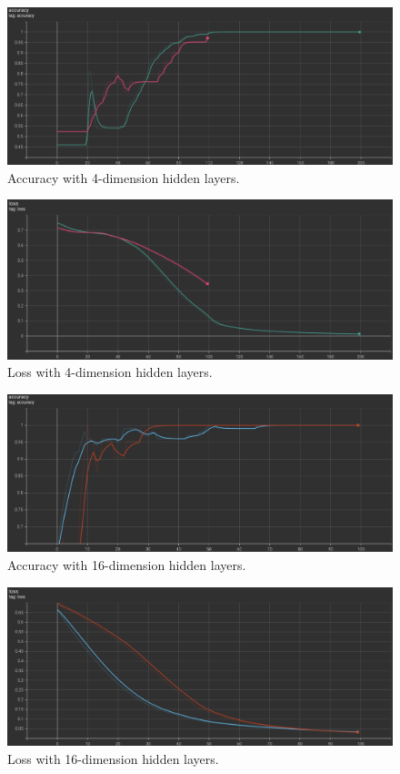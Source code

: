 	\begin{figure}[H]
		\centering
		\includegraphics[scale=0.5]{img/adam_acc.png}
		\caption{Accuracy with 4-dimension hidden layers.}
		\label{dim-acc-4}
	\end{figure}
	\begin{figure}[H]
		\centering
		\includegraphics[scale=0.5]{img/adam_loss.png}
		\caption{Loss with 4-dimension hidden layers.}
		\label{dim-loss-4}
	\end{figure}

	\begin{figure}[H]
		\centering
		\includegraphics[scale=0.5]{img/acc_16.png}
		\caption{Accuracy with 16-dimension hidden layers.}
		\label{dim-acc-16}
	\end{figure}
	\begin{figure}[H]
		\centering
		\includegraphics[scale=0.5]{img/loss_16.png}
		\caption{Loss with 16-dimension hidden layers.}
		\label{dim-loss-16}
	\end{figure}
